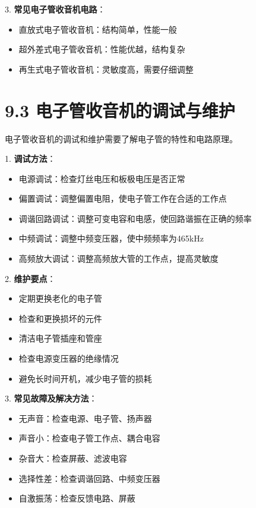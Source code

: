 \documentclass[12pt,UTF8]{ctexbook}
\begin{document}
3. \textbf{常见电子管收音机电路}：
   \begin{itemize}[leftmargin=3.5em]
   \item 直放式电子管收音机：结构简单，性能一般
   \item 超外差式电子管收音机：性能优越，结构复杂
   \item 再生式电子管收音机：灵敏度高，需要仔细调整
   \end{itemize}

\section*{9.3 电子管收音机的调试与维护}

电子管收音机的调试和维护需要了解电子管的特性和电路原理。

1. \textbf{调试方法}：
   \begin{itemize}[leftmargin=3.5em]
   \item 电源调试：检查灯丝电压和板极电压是否正常
   \item 偏置调试：调整偏置电阻，使电子管工作在合适的工作点
   \item 调谐回路调试：调整可变电容和电感，使回路谐振在正确的频率
   \item 中频调试：调整中频变压器，使中频频率为465kHz
   \item 高频放大调试：调整高频放大管的工作点，提高灵敏度
   \end{itemize}

2. \textbf{维护要点}：
   \begin{itemize}[leftmargin=3.5em]
   \item 定期更换老化的电子管
   \item 检查和更换损坏的元件
   \item 清洁电子管插座和管座
   \item 检查电源变压器的绝缘情况
   \item 避免长时间开机，减少电子管的损耗
   \end{itemize}

3. \textbf{常见故障及解决方法}：
   \begin{itemize}[leftmargin=3.5em]
   \item 无声音：检查电源、电子管、扬声器
   \item 声音小：检查电子管工作点、耦合电容
   \item 杂音大：检查屏蔽、滤波电容
   \item 选择性差：检查调谐回路、中频变压器
   \item 自激振荡：检查反馈电路、屏蔽
   \end{itemize}
\end{document}
